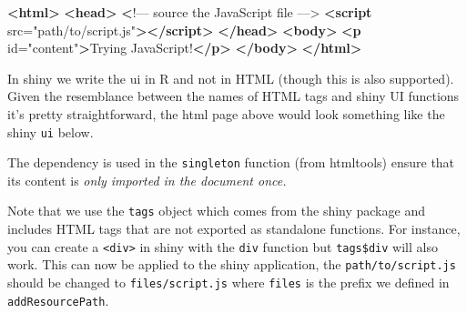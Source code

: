 \documentclass[
]{krantz}
\makeatletter
\newenvironment{Shaded}{\begin{snugshade}}{\end{snugshade}}
\newcommand{\DataTypeTok}[1]{\textcolor[rgb]{0.27,0.27,0.27}{#1}}
\newcommand{\ErrorTok}[1]{\textcolor[rgb]{0.14,0.14,0.14}{\textbf{#1}}}
\newcommand{\KeywordTok}[1]{\textcolor[rgb]{0.27,0.27,0.27}{\textbf{#1}}}
\newcommand{\NormalTok}[1]{#1}
\newcommand{\OperatorTok}[1]{\textcolor[rgb]{0.43,0.43,0.43}{\textbf{#1}}}
\newcommand{\OtherTok}[1]{\textcolor[rgb]{0.37,0.37,0.37}{#1}}
\newcommand{\StringTok}[1]{\textcolor[rgb]{0.5,0.5,0.5}{#1}}
\newenvironment{kframe}{%
\medskip{}
\setlength{\fboxsep}{.8em}
 \def\at@end@of@kframe{}%
 \ifinner\ifhmode%
  \def\at@end@of@kframe{\end{minipage}}%
  \begin{minipage}{\columnwidth}%
 \fi\fi%
 \def\FrameCommand##1{\hskip\@totalleftmargin \hskip-\fboxsep
 \colorbox{shadecolor}{##1}\hskip-\fboxsep
     \hskip-\linewidth \hskip-\@totalleftmargin \hskip\columnwidth}%
 \MakeFramed {\advance\hsize-\width
   \@totalleftmargin\z@ \linewidth\hsize
   \@setminipage}}%
 {\par\unskip\endMakeFramed%
 \at@end@of@kframe}
\renewenvironment{Shaded}{\begin{kframe}}{\end{kframe}}
\makeatother
\begin{document}
\begin{Shaded}
\begin{Highlighting}[]
\KeywordTok{<html>}
  \KeywordTok{<head>}
    \ErrorTok{<}\NormalTok{!–– source the JavaScript file ––>}
    \KeywordTok{<script}\OtherTok{ src=}\StringTok{"path/to/script.js"}\KeywordTok{></script>}
  \KeywordTok{</head>}
  \KeywordTok{<body>}
    \KeywordTok{<p}\OtherTok{ id=}\StringTok{"content"}\KeywordTok{>}\NormalTok{Trying JavaScript!}\KeywordTok{</p>}
  \KeywordTok{</body>}
\KeywordTok{</html>}
\end{Highlighting}
\end{Shaded}

In shiny we write the ui in R and not in HTML (though this is also supported). Given the resemblance between the names of HTML tags and shiny UI functions it's pretty straightforward, the html page above would look something like the shiny \texttt{ui} below.

\begin{Shaded}
\end{Shaded}

The dependency is used in the \texttt{singleton} function (from htmltools) ensure that its content is \emph{only imported in the document once.}

Note that we use the \texttt{tags} object which comes from the shiny package and includes HTML tags that are not exported as standalone functions. For instance, you can create a \texttt{\textless{}div\textgreater{}} in shiny with the \texttt{div} function but \texttt{tags\$div} will also work. This can now be applied to the shiny application, the \texttt{path/to/script.js} should be changed to \texttt{files/script.js} where \texttt{files} is the prefix we defined in \texttt{addResourcePath}.
\end{document}
